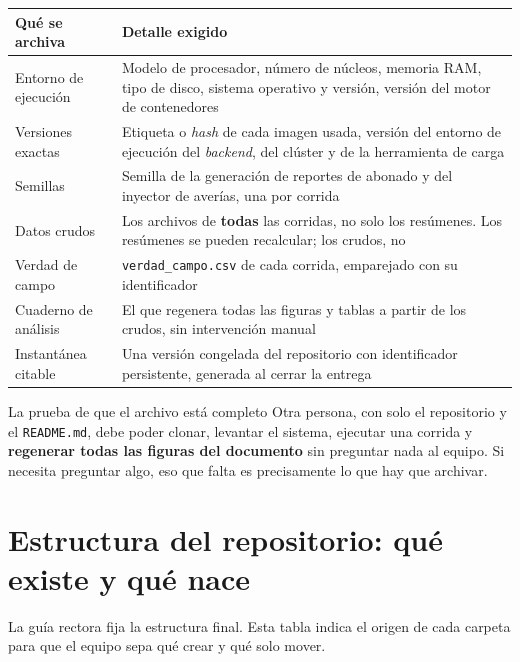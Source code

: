 \documentclass[11pt,a4paper]{article}
\begin{document}
\begin{center}
	\small
	\begin{tabular}{@{}p{4.4cm}p{10.5cm}@{}}
		\toprule
		\textbf{Qué se archiva} & \textbf{Detalle exigido} \\
		\midrule
		Entorno de ejecución & Modelo de procesador, número de núcleos, memoria RAM, tipo de disco, sistema operativo y versión, versión del motor de contenedores \\
		\addlinespace
		Versiones exactas & Etiqueta o \emph{hash} de cada imagen usada, versión del entorno de ejecución del \emph{backend}, del clúster y de la herramienta de carga \\
		\addlinespace
		Semillas & Semilla de la generación de reportes de abonado y del inyector de averías, una por corrida \\
		\addlinespace
		Datos crudos & Los archivos de \textbf{todas} las corridas, no solo los resúmenes. Los resúmenes se pueden recalcular; los crudos, no \\
		\addlinespace
		Verdad de campo & \texttt{verdad\_campo.csv} de cada corrida, emparejado con su identificador \\
		\addlinespace
		Cuaderno de análisis & El que regenera todas las figuras y tablas a partir de los crudos, sin intervención manual \\
		\addlinespace
		Instantánea citable & Una versión congelada del repositorio con identificador persistente, generada al cerrar la entrega \\
		\bottomrule
	\end{tabular}
\end{center}

\begin{defBox}{La prueba de que el archivo está completo}
	Otra persona, con solo el repositorio y el \texttt{README.md}, debe poder clonar, levantar el sistema, ejecutar una corrida y \textbf{regenerar todas las figuras del documento} sin preguntar nada al equipo. Si necesita preguntar algo, eso que falta es precisamente lo que hay que archivar.
\end{defBox}

\section{Estructura del repositorio: qué existe y qué nace}

La guía rectora fija la estructura final. Esta tabla indica el origen de cada carpeta para que el equipo sepa qué crear y qué solo mover.
\end{document}
